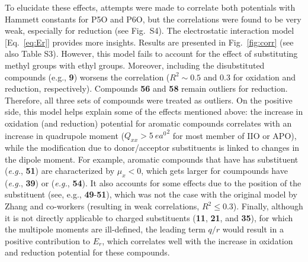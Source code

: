 \documentclass[review]{elsarticle}
\begin{document}
To elucidate these effects, attempts were made to correlate both potentials with Hammett constants for P5O and P6O, but the correlations were found to be very weak, especially for reduction (see Fig.~S4). The electrostatic interaction model [Eq.~\eqref{eq:Er}] provides more insights. Results are presented in Fig.~\ref{fig:corr} (see also Table S3). However, this model fails to account for the effect of substituting methyl groups with ethyl groups. Moreover, including the disubstituted compounds (e.g., \textbf{9}) worsens the correlation ($R^2 \sim 0.5$ and 0.3 for oxidation and reduction, respectively). Compounds \textbf{56} and \textbf{58} remain outliers for reduction. Therefore, all three sets of compounds were treated as outliers.
On the positive side, this model helps explain some of the effects mentioned above: the increase in oxidation (and reduction) potential for aromatic compounds correlates with an increase in quadrupole moment ($Q_{xx} > \SI{5}{\elementarycharge\bohr\squared}$ for most member of IIO or APO), while the modification due to donor/acceptor substituents is linked to changes in the dipole moment. For example, aromatic compounds that have  has substituent (\textit{e.g.}, \textbf{51}) are characterized by  $\mu_{x} < 0$, which gets larger for coumpounds have  (\textit{e.g.}, \textbf{39}) or  (\textit{e.g.}, \textbf{54}). It also accounts for some effects due to the position of the substituent (see, e.g., \textbf{49}-\textbf{51}), which was not the case with the original model by Zhang and co-workers (resulting in weak correlations, $R^2 \leq 0.3$).
Finally, although it is not directly applicable to charged substituents (\textbf{11}, \textbf{21}, and \textbf{35}), for which the multipole moments are ill-defined, the leading term $q/r$ would result in a positive contribution to $E_r$, which correlates well with the increase in oxidation and reduction potential for these compounds.
\end{document}
